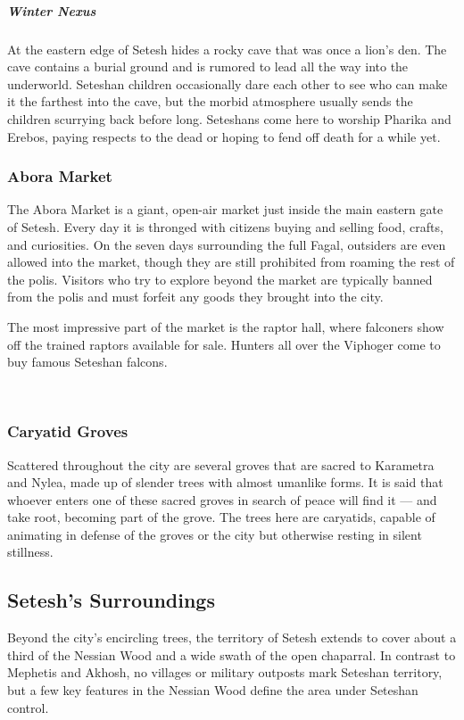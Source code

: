         \vspace{12.5cm}

        \subparagraph{Winter Nexus} At the eastern edge of Setesh hides a rocky cave that was once a lion's den.
        The cave contains a burial ground and is rumored to lead all the way into the underworld.
        Seteshan children occasionally dare each other to see who can make it the farthest into the cave, but the morbid atmosphere usually sends the children scurrying back before long.
        Seteshans come here to worship Pharika and Erebos, paying respects to the dead or hoping to fend off death for a while yet.

    \subsubsection{Abora Market}
        The Abora Market is a giant, open-air market just inside the main eastern gate of Setesh.
        Every day it is thronged with citizens buying and selling food, crafts, and curiosities.
        On the seven days surrounding the full Fagal, outsiders are even allowed into the market, though they are still prohibited from roaming the rest of the polis.
        Visitors who try to explore beyond the market are typically banned from the polis and must forfeit any goods they brought into the city.

        The most impressive part of the market is the raptor hall, where falconers show off the trained raptors available for sale.
        Hunters all over the Viphoger come to buy famous Seteshan falcons.

        \pagebreak~
        \vspace{12.5cm}

    \subsubsection{Caryatid Groves}
        Scattered throughout the city are several groves that are sacred to Karametra and Nylea, made up of slender trees with almost umanlike forms.
        It is said that whoever enters one of these sacred groves in search of peace will find it --- and take root, becoming part of the grove.
        The trees here are caryatids, capable of animating in defense of the groves or the city but otherwise resting in silent stillness.

\subsection*{Setesh's Surroundings}
    Beyond the city's encircling trees, the territory of Setesh extends to cover about a third of the Nessian Wood and a wide swath of the open chaparral.
    In contrast to Mephetis and Akhosh, no villages or military outposts mark Seteshan territory, but a few key features in the Nessian Wood define the area under Seteshan control.

